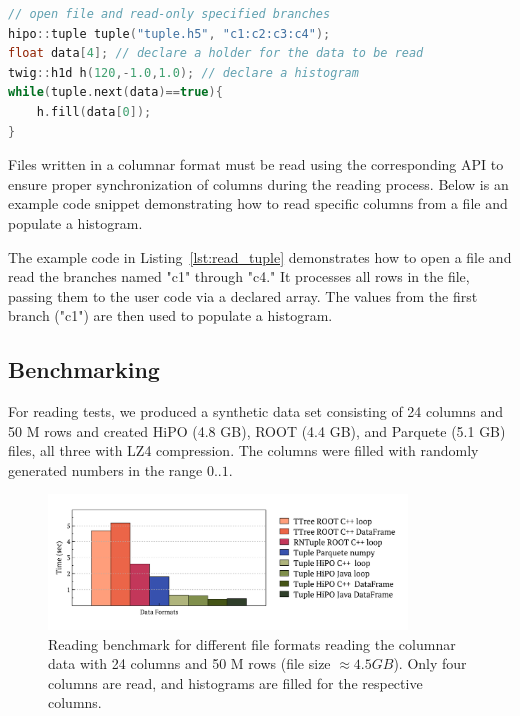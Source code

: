 \documentclass[preprint,12pt]{elsarticle}
\begin{document}
\begin{lstlisting}[language=c++, caption=c++ example to read HiPO tuple file and fill a histogram., label=lst:read_tuple]
// open file and read-only specified branches
hipo::tuple tuple("tuple.h5", "c1:c2:c3:c4"); 
float data[4]; // declare a holder for the data to be read
twig::h1d h(120,-1.0,1.0); // declare a histogram
while(tuple.next(data)==true){
    h.fill(data[0]);
}
\end{lstlisting}

Files written in a columnar format must be read using the corresponding API to ensure proper synchronization of columns during the reading process. Below is an example code snippet demonstrating how to read specific columns from a file and populate a histogram.

The example code in Listing~\ref{lst:read_tuple} demonstrates how to open a file and read the branches named "c1" through "c4." It processes all rows in the file, passing them to the user code via a declared array. The values from the first branch ("c1") are then used to populate a histogram.

\subsection{Benchmarking}

For reading tests, we produced a synthetic data set consisting of 24 columns and 50 M rows and created HiPO (4.8 GB), ROOT (4.4 GB), and Parquete (5.1 GB) files, all three with LZ4 compression. The columns were filled with randomly generated numbers in the range $0..1$. 

\begin{figure}[h!]
  \begin{center}
    \includegraphics[width=0.85\textwidth]{images/benchmark_final.pdf}
 \end{center}
  \caption{Reading benchmark for different file formats reading the columnar data with 24 columns and 50 M rows (file size $\approx 4.5 GB$). Only four columns are read, and histograms are filled for the respective columns. }
 \label{read_benchmark}
\end{figure}
\end{document}
